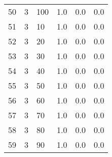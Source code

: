 \documentclass{article}
\begin{document}
{\begin{tabular}{llllll}
50 &         3 &        100 &              1.0 &                       0.0 &                                   0.0 \\
51 &         3 &         10 &              1.0 &                       0.0 &                                   0.0 \\
52 &         3 &         20 &              1.0 &                       0.0 &                                   0.0 \\
53 &         3 &         30 &              1.0 &                       0.0 &                                   0.0 \\
54 &         3 &         40 &              1.0 &                       0.0 &                                   0.0 \\
55 &         3 &         50 &              1.0 &                       0.0 &                                   0.0 \\
56 &         3 &         60 &              1.0 &                       0.0 &                                   0.0 \\
57 &         3 &         70 &              1.0 &                       0.0 &                                   0.0 \\
58 &         3 &         80 &              1.0 &                       0.0 &                                   0.0 \\
59 &         3 &         90 &              1.0 &                       0.0 &                                   0.0 \\
\bottomrule
\end{tabular}
}
\newpage
\end{document}
